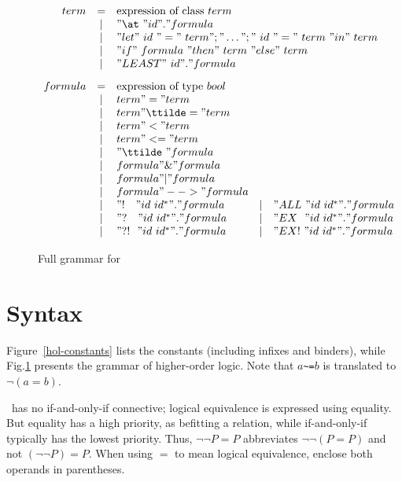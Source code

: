 \begin{figure}
\dquotes
\[\begin{array}{rclcl}
    term & = & \hbox{expression of class~$term$} \\
         & | & "\at~" id " . " formula \\
         & | & 
    \multicolumn{3}{l}{"let"~id~"="~term";"\dots";"~id~"="~term~"in"~term} \\
         & | & 
    \multicolumn{3}{l}{"if"~formula~"then"~term~"else"~term} \\
         & | & "LEAST"~ id " . " formula \\[2ex]
 formula & = & \hbox{expression of type~$bool$} \\
         & | & term " = " term \\
         & | & term " \ttilde= " term \\
         & | & term " < " term \\
         & | & term " <= " term \\
         & | & "\ttilde\ " formula \\
         & | & formula " \& " formula \\
         & | & formula " | " formula \\
         & | & formula " --> " formula \\
         & | & "!~~~" id~id^* " . " formula 
         & | & "ALL~" id~id^* " . " formula \\
         & | & "?~~~" id~id^* " . " formula 
         & | & "EX~~" id~id^* " . " formula \\
         & | & "?!~~" id~id^* " . " formula 
         & | & "EX!~" id~id^* " . " formula
  \end{array}
\]
\caption{Full grammar for \HOL} \label{hol-grammar}
\end{figure} 


\section{Syntax}

Figure~\ref{hol-constants} lists the constants (including infixes and
binders), while Fig.\ts\ref{hol-grammar} presents the grammar of
higher-order logic.  Note that $a$\verb|~=|$b$ is translated to
$\neg(a=b)$.

\begin{warn}
  \HOL\ has no if-and-only-if connective; logical equivalence is expressed
  using equality.  But equality has a high priority, as befitting a
  relation, while if-and-only-if typically has the lowest priority.  Thus,
  $\neg\neg P=P$ abbreviates $\neg\neg (P=P)$ and not $(\neg\neg P)=P$.
  When using $=$ to mean logical equivalence, enclose both operands in
  parentheses.
\end{warn}

